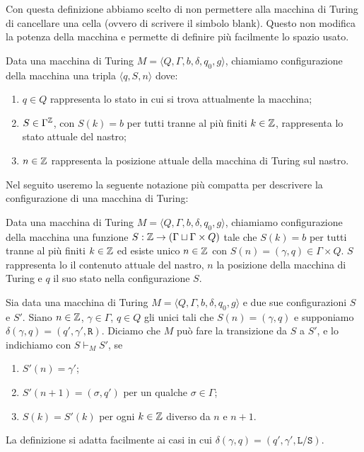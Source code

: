 \begin{osservazione}
 Con questa definizione abbiamo scelto di non permettere alla macchina di Turing
 di cancellare una cella (ovvero di scrivere il simbolo blank).
 Questo non modifica la potenza della macchina e permette di definire più facilmente
 lo spazio usato.
\end{osservazione}


\begin{definizione}
 Data una macchina di Turing $M=\langle Q, \Gamma, b, \delta, q_0, g \rangle$,
 chiamiamo configurazione della macchina una tripla
 $\langle q, S, n \rangle$ dove:
 \begin{enumerate}
  \item $q \in Q$ rappresenta lo stato in cui si trova attualmente la macchina;
  \item $S \in \Gamma ^ {\mathbb{Z}}$, con $S(k)=b$ per tutti tranne al più finiti $k \in \mathbb{Z}$,
  rappresenta lo stato attuale del nastro;
  \item $n \in \mathbb{Z}$ rappresenta la posizione attuale della macchina di Turing
  sul nastro.
 \end{enumerate}
\end{definizione}
Nel seguito useremo la seguente notazione più compatta per descrivere la
configurazione di una macchina di Turing:
\begin{definizione}
\label{def:conf-TM}
 Data una macchina di Turing $M=\langle Q, \Gamma, b, \delta, q_0, g \rangle$,
 chiamiamo configurazione della macchina una funzione
 $S: \mathbb{Z} \to (\Gamma \sqcup \Gamma \times Q)$  tale che $S(k)=b$ per
 tutti tranne al più finiti $k \in \mathbb{Z}$ ed esiste unico $n \in \mathbb{Z}$ con
 $S(n) = (\gamma, q) \in \Gamma \times Q$.
 $S$ rappresenta lo il contenuto attuale del nastro, $n$ la posizione della
 macchina di Turing e $q$ il suo stato nella configurazione $S$.
\end{definizione}

\begin{definizione}
 Sia data una macchina di Turing $M=\langle Q, \Gamma, b, \delta, q_0, g \rangle$
 e due sue configurazioni $S$ e $S'$.
 Siano $n \in \mathbb{Z}$, $\gamma \in \Gamma$, $q \in Q$ gli unici tali che
 $S(n) = (\gamma, q)$ e supponiamo $\delta(\gamma, q) = (q', \gamma', \texttt{R})$.
 Diciamo che
 $M$ può fare la transizione da $S$ a $S'$, e lo indichiamo con $S \vdash_M S'$,
 se 
 \begin{enumerate}
  \item $S'(n)=\gamma'$;
  \item $S'(n+1)=(\sigma, q')$ per un
 qualche $\sigma \in \Gamma$;
  \item $S(k) = S'(k)$ per ogni $k \in \mathbb{Z}$ diverso da
 $n$ e $n+1$.
 \end{enumerate}
 La definizione si adatta facilmente ai casi in cui
 $\delta(\gamma, q) = (q', \gamma', \texttt{L}/\texttt{S})$.
\end{definizione}

